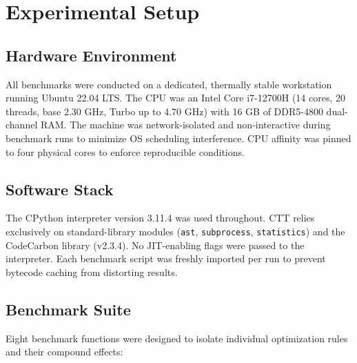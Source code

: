 \documentclass[conference]{IEEEtran}
\begin{document}
\section{Experimental Setup}

\subsection{Hardware Environment}

All benchmarks were conducted on a dedicated, thermally stable workstation
running Ubuntu 22.04 LTS.  The CPU was an Intel Core i7-12700H (14 cores,
20 threads, base 2.30 GHz, Turbo up to 4.70 GHz) with 16 GB of DDR5-4800
dual-channel RAM.  The machine was network-isolated and non-interactive during
benchmark runs to minimize OS scheduling interference.  CPU affinity was
pinned to four physical cores to enforce reproducible conditions.

\subsection{Software Stack}

The CPython interpreter version 3.11.4 was used throughout.  CTT relies
exclusively on standard-library modules (\texttt{ast}, \texttt{subprocess},
\texttt{statistics}) and the CodeCarbon library (v2.3.4).  No JIT-enabling
flags were passed to the interpreter.  Each benchmark script was freshly
imported per run to prevent bytecode caching from distorting results.

\subsection{Benchmark Suite}

Eight benchmark functions were designed to isolate individual optimization
rules and their compound effects:
\end{document}

